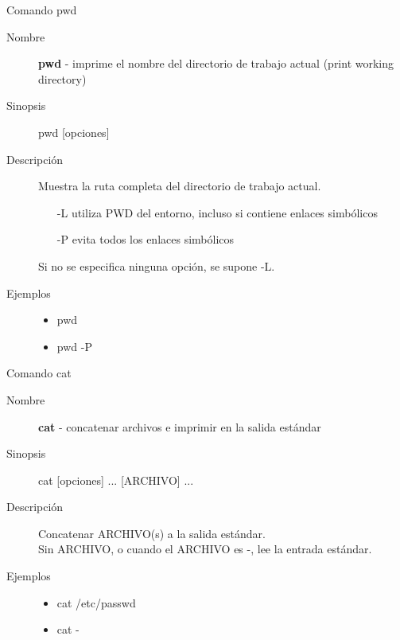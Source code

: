 \begin{frame}[c]{Comando pwd}
  \begin{description}
    \item[Nombre]
      \textbf{pwd} - imprime el nombre del directorio de trabajo actual (print working directory)

    \vspace{\baselineskip}
    \item[Sinopsis]
      pwd [opciones]

    \vspace{\baselineskip}
    \item[Descripción]
      Muestra la ruta completa del directorio de trabajo actual.

      \begin{itemize}
        \item [-L] utiliza PWD del entorno, incluso si contiene enlaces
          simbólicos
        \item [-P] evita todos los enlaces simbólicos
      \end{itemize}

      \vspace{\baselineskip}
      Si no se especifica ninguna opción, se supone -L.

    \vspace{\baselineskip}
    \item[Ejemplos]
      \begin{itemize}
        \item pwd
        \item pwd -P
      \end{itemize}
  \end{description}
\end{frame}

\begin{frame}[c]{Comando cat}
  \begin{description}
    \item[Nombre]
      \textbf{cat} - concatenar archivos e imprimir en la salida estándar

    \vspace{\baselineskip}
    \item[Sinopsis]
      cat [opciones] ... [ARCHIVO] ...

    \vspace{\baselineskip}
    \item[Descripción]
      Concatenar ARCHIVO(s) a la salida estándar. \\
      Sin ARCHIVO, o cuando el ARCHIVO es -, lee la entrada estándar.

    \vspace{\baselineskip}
    \item[Ejemplos]
      \begin{itemize}
        \item cat /etc/passwd
        \item cat -
      \end{itemize}
  \end{description}
\end{frame}

